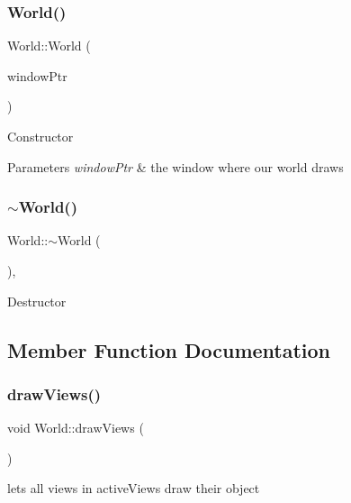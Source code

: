 \subsubsection{\texorpdfstring{World()}{World()}}
{\footnotesize\ttfamily World\+::\+World (\begin{DoxyParamCaption}\item[{std\+::shared\+\_\+ptr$<$ sf\+::\+Render\+Window $>$}]{window\+Ptr }\end{DoxyParamCaption})\hspace{0.3cm}{\ttfamily [explicit]}}

Constructor 
\begin{DoxyParams}{Parameters}
{\em window\+Ptr} & the window where our world draws \\
\hline
\end{DoxyParams}
\mbox{\label{classWorld_adf5e8724afb4d083e566ee4e48905bf2}} 
\subsubsection{\texorpdfstring{$\sim$\+World()}{~World()}}
{\footnotesize\ttfamily World\+::$\sim$\+World (\begin{DoxyParamCaption}{ }\end{DoxyParamCaption})\hspace{0.3cm}{\ttfamily [override]}, {\ttfamily [default]}}

Destructor 

\subsection{Member Function Documentation}
\mbox{\label{classWorld_a8e8ad60668f8fe975f03bcb612264bc4}} 
\subsubsection{\texorpdfstring{draw\+Views()}{drawViews()}}
{\footnotesize\ttfamily void World\+::draw\+Views (\begin{DoxyParamCaption}{ }\end{DoxyParamCaption})}

lets all views in active\+Views draw their object \mbox{\label{classWorld_ad37fe32cce284282361b9e7397b27a23}} 

